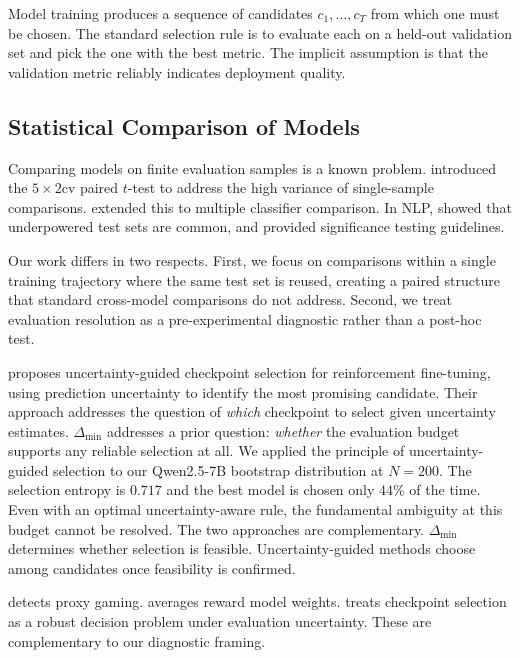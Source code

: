 \documentclass[pdflatex,sn-mathphys-ay,oneside]{sn-jnl}
\theoremstyle{thmstylethree}
\begin{document}
Model training produces a sequence of candidates $c_1,\dots,c_T$ from which one must be chosen. The standard selection rule is to evaluate each on a held-out validation set and pick the one with the best metric. The implicit assumption is that the validation metric reliably indicates deployment quality.

\subsection{Statistical Comparison of Models}

Comparing models on finite evaluation samples is a known problem. \citet{dietterich1998approximate} introduced the $5\times2$cv paired $t$-test to address the high variance of single-sample comparisons. \citet{demsar2006statistical} extended this to multiple classifier comparison. In NLP, \citet{card2020power} showed that underpowered test sets are common, and \citet{dror2018hitchhiker} provided significance testing guidelines.

Our work differs in two respects. First, we focus on comparisons within a single training trajectory where the same test set is reused, creating a paired structure that standard cross-model comparisons do not address. Second, we treat evaluation resolution as a pre-experimental diagnostic rather than a post-hoc test.

\citet{nguyen2025ugcs} proposes uncertainty-guided checkpoint selection for reinforcement fine-tuning, using prediction uncertainty to identify the most promising candidate. Their approach addresses the question of \emph{which} checkpoint to select given uncertainty estimates. $\Delta_{\min}$ addresses a prior question: \emph{whether} the evaluation budget supports any reliable selection at all. We applied the principle of uncertainty-guided selection to our Qwen2.5-7B bootstrap distribution at $N=200$. The selection entropy is $0.717$ and the best model is chosen only $44\%$ of the time. Even with an optimal uncertainty-aware rule, the fundamental ambiguity at this budget cannot be resolved. The two approaches are complementary. $\Delta_{\min}$ determines whether selection is feasible. Uncertainty-guided methods choose among candidates once feasibility is confirmed.

\citet{shihab2025est} detects proxy gaming. \citet{rame2024warm} averages reward model weights. \citet{xu2026a} treats checkpoint selection as a robust decision problem under evaluation uncertainty. These are complementary to our diagnostic framing.
\end{document}
